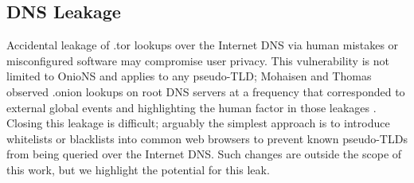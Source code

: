 \documentclass[USenglish,oneside,twocolumn]{article}
\begin{document}


\subsection{DNS Leakage}

Accidental leakage of .tor lookups over the Internet DNS via human mistakes or misconfigured software may compromise user privacy. This vulnerability is not limited to OnioNS and applies to any pseudo-TLD; Mohaisen and Thomas observed .onion lookups on root DNS servers at a frequency that corresponded to external global events and highlighting the human factor in those leakages \cite{thomasmeasuring}. Closing this leakage is difficult; arguably the simplest approach is to introduce whitelists or blacklists into common web browsers to prevent known pseudo-TLDs from being queried over the Internet DNS. Such changes are outside the scope of this work, but we highlight the potential for this leak.




\end{document}
